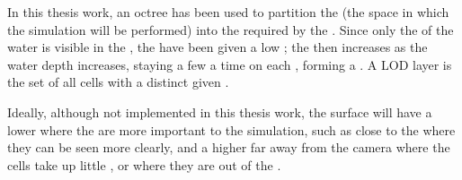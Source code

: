 In this thesis work, an octree has been used to partition the  (the space in which the simulation will be performed) into the \cells required by the \FVM. Since only the \surface of the water is visible in the \simulation, the  have been given a low \LOD; the \LOD then increases as the water depth increases, staying a few  a time on each \LOD, forming a . A LOD layer is the set of all cells with a distinct given \LOD.

Ideally, although not implemented in this thesis work, the surface will have a lower \LOD where the  are more important to the simulation, such as close to the \camera where they can be seen more clearly, and a higher \LOD far away from the camera where the cells take up little , or where they are out of the \FOV.

